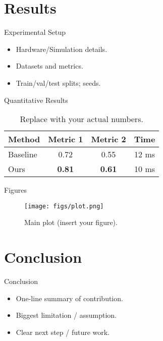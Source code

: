 \documentclass[10pt,aspectratio=169]{beamer}
\theoremstyle{definition}
\theoremstyle{plain}
\theoremstyle{remark}
\begin{document}
	\section{Results}
	
	\begin{frame}{Experimental Setup}
		\begin{itemize}
			\item Hardware/Simulation details.
			\item Datasets and metrics.
			\item Train/val/test splits; seeds.
		\end{itemize}
	\end{frame}
	
	\begin{frame}{Quantitative Results}
		\begin{table}
			\centering
			\begin{tabular}{lccc}
				\toprule
				Method & Metric 1 & Metric 2 & Time \\
				\midrule
				Baseline & 0.72 & 0.55 & 12 ms \\
				Ours     & \textbf{0.81} & \textbf{0.61} & 10 ms \\
				\bottomrule
			\end{tabular}
			\caption{Replace with your actual numbers.}
		\end{table}
	\end{frame}
	
	\begin{frame}{Figures}
		\begin{figure}
			\texttt{[image: figs/plot.png]}
			\caption{Main plot (insert your figure).}
		\end{figure}
	\end{frame}
	
	\section{Conclusion}
	
	\begin{frame}{Conclusion}
		\begin{itemize}
			\item One-line summary of contribution.
			\item Biggest limitation / assumption.
			\item Clear next step / future work.
		\end{itemize}
	\end{frame}
	
\end{document}
